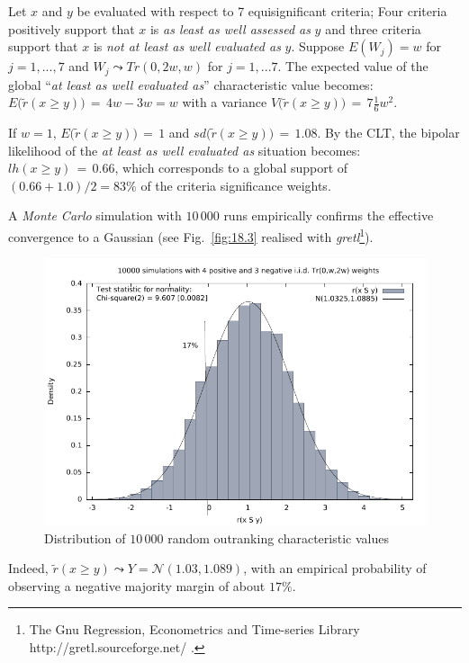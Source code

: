 \begin{example} Let $x$ and $y$ be evaluated with respect to 7 equisignificant criteria; Four criteria positively support that $x$ is \emph{as least as  well assessed as} $y$ and three criteria support that $x$ is \emph{not at least as well evaluated as} $y$. Suppose $E(W_j) = w$ for $j = 1,...,7$ and $W_j \leadsto Tr(0, 2w, w)$ for $j = 1,...7$. The expected value of the global ``\emph{at least as well evaluated as}'' characteristic value becomes: $E\big(\tilde{r}(x \geq y)\big)\, = \, 4w - 3w = w$ with a variance $V\big(\tilde{r}(x \geq y)\big)\,=\, 7\frac{1}{6}w^2$. 

If $w = 1$, $E\big(\tilde{r}(x \geq y)\big)\, = \, 1$ and $sd\big(\tilde{r}(x \geq y)\big)\,=\, 1.08$. By the CLT, the bipolar likelihood of the \emph{at least as well evaluated as} situation becomes: $lh(x \geq y)\,=\, 0.66$, which corresponds to a global support of $(0.66 + 1.0)/2 = 83\%$ of the criteria significance weights.

A \emph{Monte Carlo} simulation with $10\,000$ runs empirically confirms the effective convergence to a Gaussian (see Fig.~\vref{fig:18.3} realised with \emph{gretl}\footnote{The Gnu Regression, Econometrics and Time-series Library http://gretl.sourceforge.net/ .}).
\begin{figure}[ht]
\includegraphics[width=\hsize]{Figures/18-3-simulLikelihood.pdf}
\caption{Distribution of $10\,000$ random outranking characteristic values}
\label{fig:18.3}       %
\end{figure}

Indeed, $\tilde{r}(x \geq y) \leadsto Y = \mathcal{N}(1.03,1.089)$, with an empirical probability of observing a negative majority margin of about $17\%$.
\end{example}

